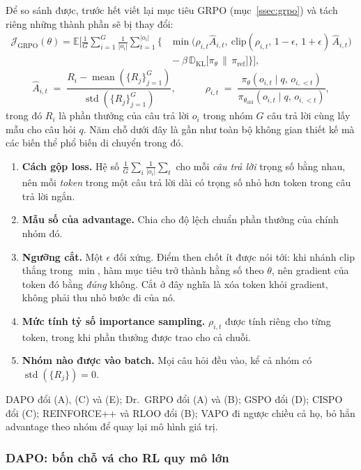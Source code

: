 Để so sánh được, trước hết viết lại mục tiêu GRPO (mục~\ref{ssec:grpo}) và tách riêng những thành phần sẽ bị thay đổi:
\[
\begin{aligned}
\mathcal{J}_{\mathrm{GRPO}}(\theta) = \mathbb{E}\Big[\frac{1}{G}\sum_{i=1}^{G}\frac{1}{|o_i|}\sum_{t=1}^{|o_i|}\Big\{
&\min\big(\rho_{i,t}\hat{A}_{i,t},\ \mathrm{clip}(\rho_{i,t},\,1-\epsilon,\,1+\epsilon)\,\hat{A}_{i,t}\big)\\
&{}-\beta\,\mathbb{D}_{\mathrm{KL}}\big[\pi_\theta\,\big\|\,\pi_{\mathrm{ref}}\big]\Big\}\Big],
\end{aligned}
\]
\[
\hat{A}_{i,t} \;=\; \frac{R_i - \operatorname{mean}(\{R_j\}_{j=1}^{G})}{\operatorname{std}(\{R_j\}_{j=1}^{G})},
\qquad\quad
\rho_{i,t} \;=\; \frac{\pi_\theta(o_{i,t}\mid q,\,o_{i,<t})}{\pi_{\theta_{\mathrm{old}}}(o_{i,t}\mid q,\,o_{i,<t})},
\]
trong đó $R_i$ là phần thưởng của câu trả lời $o_i$ trong nhóm $G$ câu trả lời cùng lấy mẫu cho câu hỏi $q$.
Năm chỗ dưới đây là gần như toàn bộ không gian thiết kế mà các biến thể phổ biến di chuyển trong đó.
\begin{enumerate}[label=(\Alph*)]
	\item \textbf{Cách gộp loss.} Hệ số $\frac{1}{G}\sum_i\frac{1}{|o_i|}\sum_t$ cho mỗi \emph{câu trả lời} trọng số bằng nhau, nên mỗi \emph{token} trong một câu trả lời dài có trọng số nhỏ hơn token trong câu trả lời ngắn.
	\item \textbf{Mẫu số của advantage.} Chia cho độ lệch chuẩn phần thưởng của chính nhóm đó.
	\item \textbf{Ngưỡng cắt.} Một $\epsilon$ đối xứng. Điểm then chốt ít được nói tới: khi nhánh $\mathrm{clip}$ thắng trong $\min$, hàm mục tiêu trở thành hằng số theo $\theta$, nên gradient của token đó bằng \emph{đúng} không. Cắt ở đây nghĩa là xóa token khỏi gradient, không phải thu nhỏ bước đi của nó.
	\item \textbf{Mức tính tỷ số importance sampling.} $\rho_{i,t}$ được tính riêng cho từng token, trong khi phần thưởng được trao cho cả chuỗi.
	\item \textbf{Nhóm nào được vào batch.} Mọi câu hỏi đều vào, kể cả nhóm có $\operatorname{std}(\{R_j\}) = 0$.
\end{enumerate}
DAPO đổi (A), (C) và (E); Dr.~GRPO đổi (A) và (B); GSPO đổi (D); CISPO đổi (C); REINFORCE++ và RLOO đổi (B); VAPO đi ngược chiều cả họ, bỏ hẳn advantage theo nhóm để quay lại mô hình giá trị.

\subsubsection{DAPO: bốn chỗ vá cho RL quy mô lớn}

